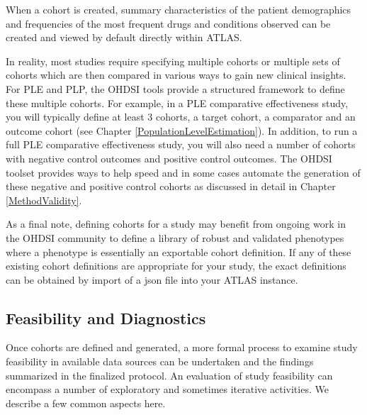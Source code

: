 \documentclass[11pt]{book}
\theoremstyle{definition}
\theoremstyle{definition}
\theoremstyle{definition}
\theoremstyle{remark}
\begin{document}
When a cohort is created, summary characteristics of the patient
demographics and frequencies of the most frequent drugs and conditions
observed can be created and viewed by default directly within ATLAS.

In reality, most studies require specifying multiple cohorts or multiple
sets of cohorts which are then compared in various ways to gain new
clinical insights. For PLE and PLP, the OHDSI tools provide a structured
framework to define these multiple cohorts. For example, in a PLE
comparative effectiveness study, you will typically define at least 3
cohorts, a target cohort, a comparator and an outcome cohort (see
Chapter \ref{PopulationLevelEstimation}). In addition, to run a full PLE
comparative effectiveness study, you will also need a number of cohorts
with negative control outcomes and positive control outcomes. The OHDSI
toolset provides ways to help speed and in some cases automate the
generation of these negative and positive control cohorts as discussed
in detail in Chapter \ref{MethodValidity}.

As a final note, defining cohorts for a study may benefit from ongoing
work in the OHDSI community to define a library of robust and validated
phenotypes where a phenotype is essentially an exportable cohort
definition. If any of these existing cohort definitions are appropriate
for your study, the exact definitions can be obtained by import of a
json file into your ATLAS instance.

\subsection{Feasibility and Diagnostics}\label{Feasibility}

 

Once cohorts are defined and generated, a more formal process to examine
study feasibility in available data sources can be undertaken and the
findings summarized in the finalized protocol. An evaluation of study
feasibility can encompass a number of exploratory and sometimes
iterative activities. We describe a few common aspects here.
\end{document}
